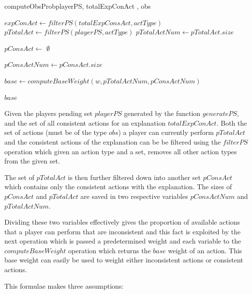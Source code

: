 \documentclass[parskip]{cs4rep}
\begin{document}
\begin{pseudocode}[ruled]{computeObsProb}{playerPS, totalExpConAct , obs}
\begin{algorithm}[H]
$expConAct \gets filterPS(totalExpConsAct, actType)$ \newline
$pTotalAct \gets filterPS(playerPS, actType)$\newline
$pTotalActNum \gets pTotalAct.size$ \newline

$pConsAct \gets $ $\emptyset$ \newline


$pConsActNum \gets pConsAct.size$\newline

$base \gets computeBaseWeight(w, pTotalActNum, pConsActNum)$\newline 

\Return $base$

\end{algorithm}
\end{pseudocode}

Given the players pending set $playerPS$ generated by the function $generatePS$, and the set of all consistent actions for an explanation $totalExpConAct$. Both the set of actions (must be of the type $obs$) a player can currently perform $pTotalAct$ and the consistent actions of the explanation can be be filtered using the $filterPS$ operation which given an action type and a set, removes all other action types from the given set. 

The set of $pTotalAct$ is then further filtered down into another set $pConsAct$ which contains only the consistent actions with the explanation. The sizes of $pConsAct$ and $pTotalAct$ are saved in two respective variables $pConsActNum$ and $pTotalActNum$.

Dividing these two variables effectively gives the proportion of available actions that a player can perform that are inconsistent and this fact is exploited by the next operation which is passed a predetermined weight and each variable to the $computeBaseWeight$ operation which returns the $base$ weight of an action. This base weight can easily be used to weight either inconsistent actions or consistent actions.

This formulae makes three assumptions:
\end{document}
